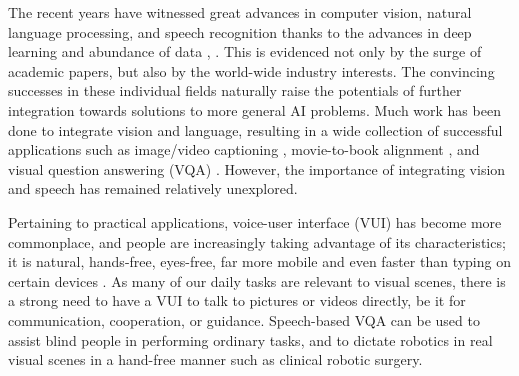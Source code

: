 \documentclass[letterpaper]{article} %
\begin{document}
The recent years have witnessed great advances in computer vision, natural language processing, and speech recognition thanks to the advances in deep learning  and abundance of data , . This is evidenced not only by the surge of academic papers, but also by the world-wide industry interests. The convincing successes in these individual fields naturally raise the potentials of further integration towards solutions to more general AI problems. Much work has been done to integrate vision and language, resulting in a wide collection of successful applications such as image/video captioning , movie-to-book alignment , and visual question answering (VQA) . However, the importance of integrating vision and speech has remained relatively unexplored.

Pertaining to practical applications, voice-user interface (VUI) has become more commonplace, and people are increasingly taking advantage of its characteristics; it is natural, hands-free, eyes-free, far more mobile and even faster than typing on certain devices . As many of our daily tasks are relevant to visual scenes, there is a strong need to have a VUI to talk to pictures or videos directly, be it for communication, cooperation, or guidance. Speech-based VQA can be used to assist blind people in performing ordinary tasks, and to dictate robotics in real visual scenes in a hand-free manner such as clinical robotic surgery.
\end{document}

